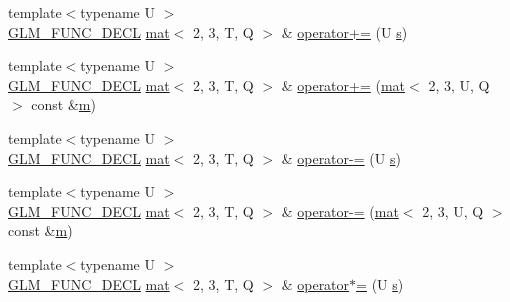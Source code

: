 \begin{DoxyCompactItemize}
\item 
{\footnotesize template$<$typename U $>$ }\\\mbox{\hyperlink{setup_8hpp_ab2d052de21a70539923e9bcbf6e83a51}{G\+L\+M\+\_\+\+F\+U\+N\+C\+\_\+\+D\+E\+CL}} \mbox{\hyperlink{structglm_1_1mat}{mat}}$<$ 2, 3, T, Q $>$ \& \mbox{\hyperlink{structglm_1_1mat_3_012_00_013_00_01_t_00_01_q_01_4_a7b22ff32851ed8d087a0e90a78832ff6}{operator+=}} (U \mbox{\hyperlink{_s_d_l__opengl_8h_a4af680a6c683f88ed67b76f207f2e6e4}{s}})
\item 
{\footnotesize template$<$typename U $>$ }\\\mbox{\hyperlink{setup_8hpp_ab2d052de21a70539923e9bcbf6e83a51}{G\+L\+M\+\_\+\+F\+U\+N\+C\+\_\+\+D\+E\+CL}} \mbox{\hyperlink{structglm_1_1mat}{mat}}$<$ 2, 3, T, Q $>$ \& \mbox{\hyperlink{structglm_1_1mat_3_012_00_013_00_01_t_00_01_q_01_4_af7b5ca79c3075e5a7901b171e627da84}{operator+=}} (\mbox{\hyperlink{structglm_1_1mat}{mat}}$<$ 2, 3, U, Q $>$ const \&\mbox{\hyperlink{_s_d_l__opengl__glext_8h_af593500c283bf1a787a6f947f503a5c2}{m}})
\item 
{\footnotesize template$<$typename U $>$ }\\\mbox{\hyperlink{setup_8hpp_ab2d052de21a70539923e9bcbf6e83a51}{G\+L\+M\+\_\+\+F\+U\+N\+C\+\_\+\+D\+E\+CL}} \mbox{\hyperlink{structglm_1_1mat}{mat}}$<$ 2, 3, T, Q $>$ \& \mbox{\hyperlink{structglm_1_1mat_3_012_00_013_00_01_t_00_01_q_01_4_a4c46929ac7d9b4f097b562df470f892c}{operator-\/=}} (U \mbox{\hyperlink{_s_d_l__opengl_8h_a4af680a6c683f88ed67b76f207f2e6e4}{s}})
\item 
{\footnotesize template$<$typename U $>$ }\\\mbox{\hyperlink{setup_8hpp_ab2d052de21a70539923e9bcbf6e83a51}{G\+L\+M\+\_\+\+F\+U\+N\+C\+\_\+\+D\+E\+CL}} \mbox{\hyperlink{structglm_1_1mat}{mat}}$<$ 2, 3, T, Q $>$ \& \mbox{\hyperlink{structglm_1_1mat_3_012_00_013_00_01_t_00_01_q_01_4_a61e885feef91901245c2b7d7e518b90f}{operator-\/=}} (\mbox{\hyperlink{structglm_1_1mat}{mat}}$<$ 2, 3, U, Q $>$ const \&\mbox{\hyperlink{_s_d_l__opengl__glext_8h_af593500c283bf1a787a6f947f503a5c2}{m}})
\item 
{\footnotesize template$<$typename U $>$ }\\\mbox{\hyperlink{setup_8hpp_ab2d052de21a70539923e9bcbf6e83a51}{G\+L\+M\+\_\+\+F\+U\+N\+C\+\_\+\+D\+E\+CL}} \mbox{\hyperlink{structglm_1_1mat}{mat}}$<$ 2, 3, T, Q $>$ \& \mbox{\hyperlink{structglm_1_1mat_3_012_00_013_00_01_t_00_01_q_01_4_acd7beea4bc1b4fb3e47e1d65663ee654}{operator$\ast$=}} (U \mbox{\hyperlink{_s_d_l__opengl_8h_a4af680a6c683f88ed67b76f207f2e6e4}{s}})

\end{DoxyCompactItemize}
